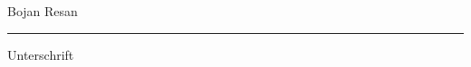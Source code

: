 \documentclass[a4paper,10pt]{scrartcl}
\begin{document}
        \vspace{1cm}

     	\begin{minipage}[t]{0.4\linewidth}
    		\textsf{Bojan Resan}
    	       \begin{figure}[H]
                \end{figure}
    		\rule{6cm}{1px}
    		{\scriptsize  \hspace{2.7cm} Unterschrift}
    	\end{minipage}
\newpage
\end{document}
